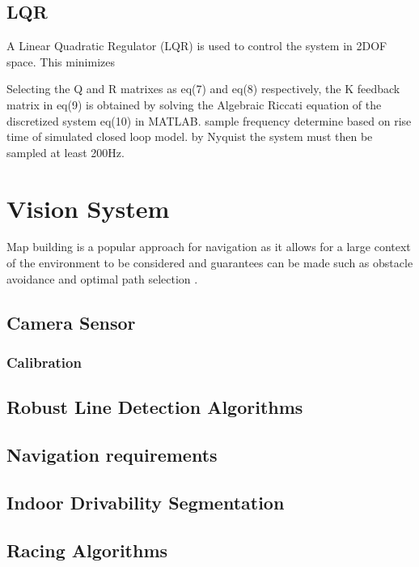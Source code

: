         \subsection{LQR}
        A Linear Quadratic Regulator (LQR) is used to control the system in 2DOF space.
        This minimizes 
        
       
        Selecting the Q and R matrixes as eq(7) and eq(8) respectively, 
        the K feedback matrix in eq(9) is obtained by solving the Algebraic Riccati
        equation of the discretized system eq(10) in MATLAB.
        sample frequency determine based on rise time of simulated closed loop model. 
        by Nyquist the system must then be sampled at least 200Hz. 

        \pagebreak{}
        \section{Vision System}

        Map building is a popular approach for navigation as it allows for a large 
        context of the environment to be considered and guarantees can be made such as obstacle avoidance and optimal path selection \cite{Macenski_2020}. 

        \subsection{Camera Sensor}

        \subsubsection{Calibration}

        \subsection{Robust Line Detection Algorithms}

        \subsection{Navigation requirements}

        \subsection{Indoor Drivability Segmentation}

        \subsection{Racing Algorithms}

